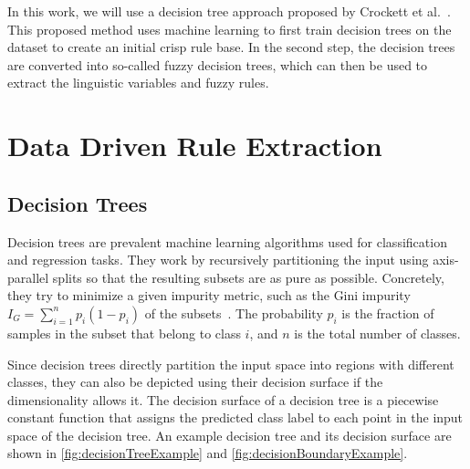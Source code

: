 In this work, we will use a decision tree approach proposed by Crockett et al.~\cite{CROCKETT20062809}. This proposed method uses machine learning to first train decision trees on the dataset to create an initial crisp rule base. In the second step, the decision trees are converted into so-called fuzzy decision trees, which can then be used to extract the linguistic variables and fuzzy rules.

\section{Data Driven Rule Extraction}

\subsection{Decision Trees}

Decision trees are prevalent machine learning algorithms used for classification and regression tasks. They work by recursively partitioning the input using axis-parallel splits so that the resulting subsets are as pure as possible. Concretely, they try to minimize a given impurity metric, such as the Gini impurity $I_G = \sum_{i=1}^{n} p_i(1-p_i)$ of the subsets~\cite{10.5555/2380985}. The probability $p_i$ is the fraction of samples in the subset that belong to class $i$, and $n$ is the total number of classes.

Since decision trees directly partition the input space into regions with different classes, they can also be depicted using their decision surface if the dimensionality allows it. The decision surface of a decision tree is a piecewise constant function that assigns the predicted class label to each point in the input space of the decision tree. An example decision tree and its decision surface are shown in \autoref{fig:decisionTreeExample} and \autoref{fig:decisionBoundaryExample}.

